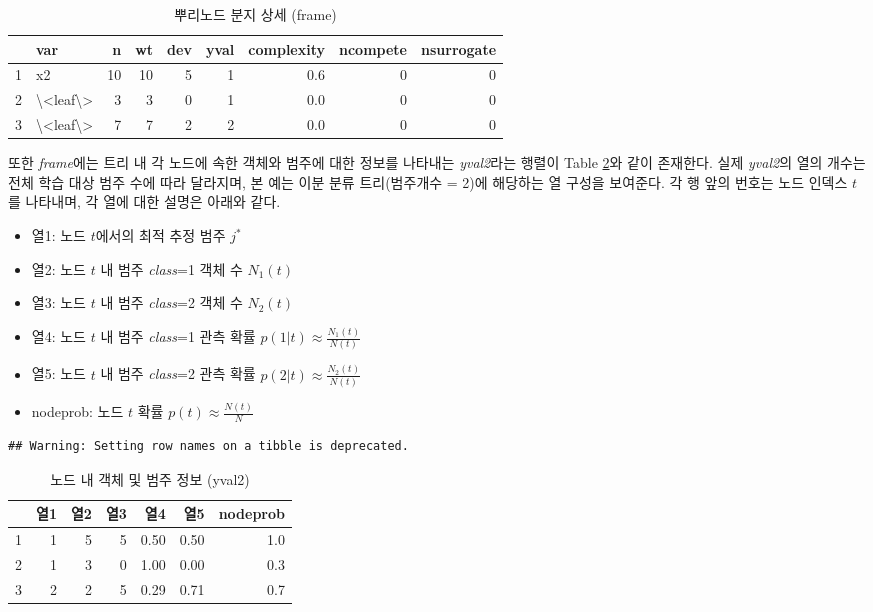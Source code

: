 \documentclass[
]{book}
\providecommand{\tightlist}{%
  \setlength{\itemsep}{0pt}\setlength{\parskip}{0pt}}
\begin{document}
\begin{table}

\caption{\label{tab:firstsplit-frame}뿌리노드 분지 상세 (frame)}
\centering
\begin{tabular}[t]{llrrrrrrr}
\toprule
  & var & n & wt & dev & yval & complexity & ncompete & nsurrogate\\
\midrule
1 & x2 & 10 & 10 & 5 & 1 & 0.6 & 0 & 0\\
2 & \textbackslash{}<leaf\textbackslash{}> & 3 & 3 & 0 & 1 & 0.0 & 0 & 0\\
3 & \textbackslash{}<leaf\textbackslash{}> & 7 & 7 & 2 & 2 & 0.0 & 0 & 0\\
\bottomrule
\end{tabular}
\end{table}

또한 \emph{frame}에는 트리 내 각 노드에 속한 객체와 범주에 대한 정보를 나타내는 \emph{yval2}라는 행렬이 Table \ref{tab:firstsplit-yval2}와 같이 존재한다. 실제 \emph{yval2}의 열의 개수는 전체 학습 대상 범주 수에 따라 달라지며, 본 예는 이분 분류 트리(범주개수 = 2)에 해당하는 열 구성을 보여준다. 각 행 앞의 번호는 노드 인덱스 \(t\)를 나타내며, 각 열에 대한 설명은 아래와 같다.

\begin{itemize}
\tightlist
\item
  열1: 노드 \(t\)에서의 최적 추정 범주 \(j^*\)
\item
  열2: 노드 \(t\) 내 범주 \emph{class}=1 객체 수 \(N_1(t)\)
\item
  열3: 노드 \(t\) 내 범주 \emph{class}=2 객체 수 \(N_2(t)\)
\item
  열4: 노드 \(t\) 내 범주 \emph{class}=1 관측 확률 \(p(1|t) \approx \tfrac{N_1(t)}{N(t)}\)
\item
  열5: 노드 \(t\) 내 범주 \emph{class}=2 관측 확률 \(p(2|t) \approx \tfrac{N_2(t)}{N(t)}\)
\item
  nodeprob: 노드 \(t\) 확률 \(p(t) \approx \tfrac{N(t)}{N}\)
\end{itemize}

\begin{verbatim}
## Warning: Setting row names on a tibble is deprecated.
\end{verbatim}

\begin{table}

\caption{\label{tab:firstsplit-yval2}노드 내 객체 및 범주 정보 (yval2)}
\centering
\begin{tabular}[t]{lrrrrrr}
\toprule
  & 열1 & 열2 & 열3 & 열4 & 열5 & nodeprob\\
\midrule
1 & 1 & 5 & 5 & 0.50 & 0.50 & 1.0\\
2 & 1 & 3 & 0 & 1.00 & 0.00 & 0.3\\
3 & 2 & 2 & 5 & 0.29 & 0.71 & 0.7\\
\bottomrule
\end{tabular}
\end{table}
\end{document}

